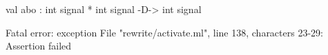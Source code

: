 \chklistingfalse
{}
\begin{ChkListingMsg}
val abo : int signal * int signal -D-> int signal
\end{ChkListingMsg}
\begin{ChkListingErr}
Fatal error: exception File "rewrite/activate.ml", line 138, characters 23-29: Assertion failed
\end{ChkListingErr}
